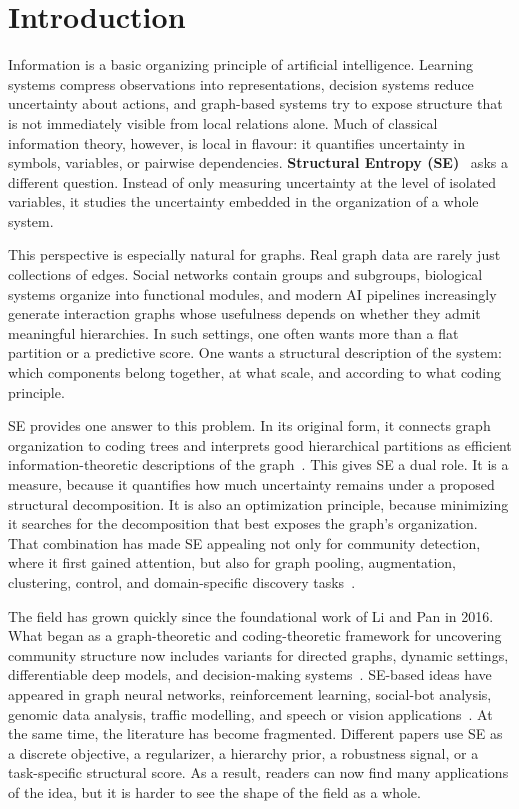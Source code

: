 \section{Introduction}
\label{sec:introduction}

Information is a basic organizing principle of artificial intelligence.
Learning systems compress observations into representations, decision systems
reduce uncertainty about actions, and graph-based systems try to expose
structure that is not immediately visible from local relations alone.
Much of classical information theory, however, is local in flavour: it
quantifies uncertainty in symbols, variables, or pairwise dependencies.
\textbf{Structural Entropy (SE)}~\cite{Li2016} asks a different question.
Instead of only measuring uncertainty at the level of isolated variables, it
studies the uncertainty embedded in the organization of a whole system.

This perspective is especially natural for graphs.
Real graph data are rarely just collections of edges.
Social networks contain groups and subgroups, biological systems organize into
functional modules, and modern AI pipelines increasingly generate interaction
graphs whose usefulness depends on whether they admit meaningful hierarchies.
In such settings, one often wants more than a flat partition or a predictive
score.
One wants a structural description of the system: which components belong
together, at what scale, and according to what coding principle.

SE provides one answer to this problem.
In its original form, it connects graph organization to coding trees and
interprets good hierarchical partitions as efficient information-theoretic
descriptions of the graph~\cite{Li2016}.
This gives SE a dual role.
It is a measure, because it quantifies how much uncertainty remains under a
proposed structural decomposition.
It is also an optimization principle, because minimizing it searches for the
decomposition that best exposes the graph's organization.
That combination has made SE appealing not only for community detection, where
it first gained attention, but also for graph pooling, augmentation,
clustering, control, and domain-specific discovery tasks~\cite{wu2022pooling,wu2023sega,zeng2025sidmJMLR,zhang2021supertad,peng2024zjyun,zhu2023HiTIN}.

The field has grown quickly since the foundational work of Li and Pan in 2016.
What began as a graph-theoretic and coding-theoretic framework for uncovering
community structure now includes variants for directed graphs, dynamic
settings, differentiable deep models, and decision-making
systems~\cite{Li2016,pan2021information,sun2024lsenet,zeng2025sidmJMLR}.
SE-based ideas have appeared in graph neural networks, reinforcement learning,
social-bot analysis, genomic data analysis, traffic modelling, and speech or
vision applications~\cite{yang2024sebot,chen2022pyseat,zou2024transformer,wang2024secodecSpeech}.
At the same time, the literature has become fragmented.
Different papers use SE as a discrete objective, a regularizer, a hierarchy
prior, a robustness signal, or a task-specific structural score.
As a result, readers can now find many applications of the idea, but it is
harder to see the shape of the field as a whole.

